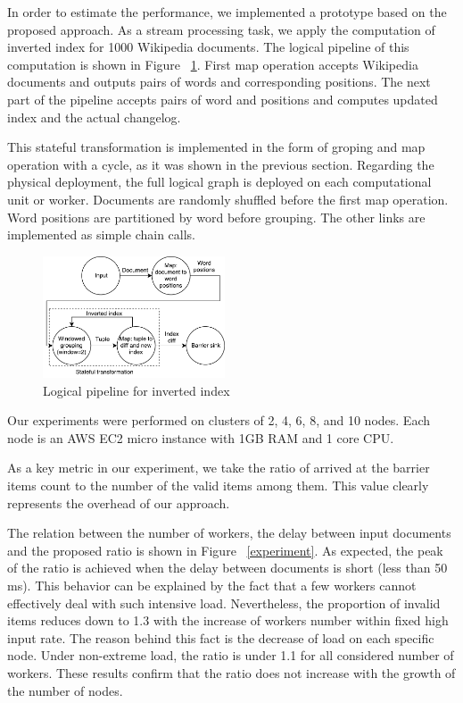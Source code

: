 
\label {fs-experiments}

In order to estimate the performance, we implemented a prototype based on the proposed approach. As a stream processing task, we apply the computation of inverted index for 1000 Wikipedia documents. The logical pipeline of this computation is shown in Figure ~\ref{inverted-index}. First map operation accepts Wikipedia documents and outputs pairs of words and corresponding positions. The next part of the pipeline accepts pairs of word and positions and computes updated index and the actual changelog. 

This stateful transformation is implemented in the form of groping and map operation with a cycle, as it was shown in the previous section. Regarding the physical deployment, the full logical graph is deployed on each computational unit or worker. Documents are randomly shuffled before the first map operation. Word positions are partitioned by word before grouping. The other links are implemented as simple chain calls.

\begin{figure}[htbp]
  \centering
  \includegraphics[width=0.48\textwidth]{pics/inverted-index}
  \caption{Logical pipeline for inverted index}
  \label {inverted-index}
\end{figure}

Our experiments were performed on clusters of 2, 4, 6, 8, and 10 nodes. Each node is an AWS EC2 micro instance with 1GB RAM and 1 core CPU.

As a key metric in our experiment, we take the ratio of arrived at the barrier items count to the number of the valid items among them. This value clearly represents the overhead of our approach. 

The relation between the number of workers, the delay between input documents and the proposed ratio is shown in Figure ~\ref{experiment}. As expected, the peak of the ratio is achieved when the delay between documents is short (less than 50 ms). This behavior can be explained by the fact that a few workers cannot effectively deal with such intensive load. Nevertheless, the proportion of invalid items reduces down to 1.3 with the increase of workers number within fixed high input rate. The reason behind this fact is the decrease of load on each specific node. Under non-extreme load, the ratio is under 1.1 for all considered number of workers. These results confirm that the ratio does not increase with the growth of the number of nodes.

